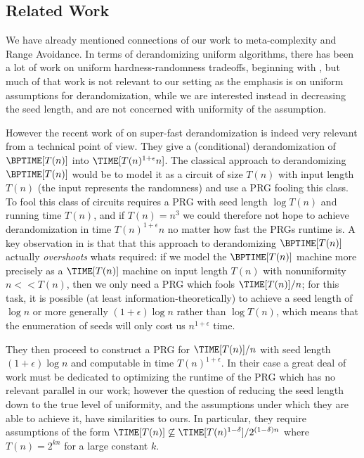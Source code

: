 \documentclass[11pt]{article}
\begin{document}
\subsection{Related Work}

We have already mentioned connections of our work to meta-complexity and Range Avoidance. In terms of derandomizing uniform algorithms, there has been a lot of work on uniform hardness-randomness tradeoffs, beginning with \cite{IW98}, but much of that work is not relevant to our setting as the emphasis is on uniform assumptions for derandomization, while we are interested instead in decreasing the seed length, and are not concerned with uniformity of the assumption. 

However the recent work of \cite{CT21a} on super-fast derandomization is indeed very relevant from a technical point of view.
They give a (conditional) derandomization of $\BPTIME[T(n)]$ into $\TIME[T(n)^{1 + \epsilon} n]$. The classical approach to derandomizing $\BPTIME[T(n)]$ would be to model it as a circuit of size $T(n)$ with input length $T(n)$ (the input represents the randomness) and use a PRG fooling this class. To fool this class of circuits requires a PRG with seed length $\log T(n)$ and running time $T(n)$, and if $T(n) = n^3$ we could therefore not hope to achieve derandomization in time $T(n)^{1+\epsilon} n$ no matter how fast the PRGs runtime is. A key observation in \cite{CT21a} is that that this approach to derandomizing $\BPTIME[T(n)]$ actually \emph{overshoots} whats required: if we model the $\BPTIME[T(n)]$ machine more precisely as a $\TIME[T(n)]$ machine on input length $T(n)$ with nonuniformity $n << T(n)$, then we only need a PRG which fools $\TIME[T(n)]/n$; for this task, it is possible (at least information-theoretically) to achieve a seed length of $\log n$ or more generally $(1 + \epsilon)\log n$ rather than $\log T(n)$, which means that the enumeration of seeds will only cost us $n^{1 + \epsilon}$ time.

They then proceed to construct a PRG for $\TIME[T(n)]/n$ with seed length $(1 + \epsilon) \log n$ and computable in time $T(n)^{1 + \epsilon}$. In their case a great deal of work must be dedicated to optimizing the runtime of the PRG which has no relevant parallel in our work; however the question of reducing the seed length down to the true level of uniformity, and the assumptions under which they are able to achieve it, have similarities to ours. In particular, they require assumptions of the form $\TIME[T(n)] \not\subseteq \TIME[T(n)^{1- \delta}]/2^{(1-\delta)n}$ where $T(n) = 2^{k n}$ for a large constant $k$.
\end{document}
